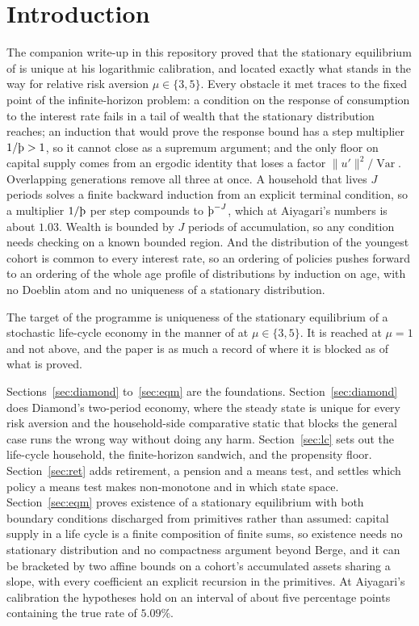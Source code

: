 \section{Introduction}

The companion write-up in this repository proved that the stationary equilibrium of
\citet{Aiyagari1994} is unique at his logarithmic calibration, and located exactly what stands in
the way for relative risk aversion $\mu\in\{3,5\}$. Every obstacle it met traces to the fixed point
of the infinite-horizon problem: a condition on the response of consumption to the interest rate
fails in a tail of wealth that the stationary distribution reaches; an induction that would prove
the response bound has a step multiplier $1/\Thorn>1$, so it cannot close as a supremum argument;
and the only floor on capital supply comes from an ergodic identity that loses a factor
$\|u'\|^2/\operatorname{Var}$. Overlapping generations remove all three at once. A household
that lives $J$ periods solves a finite backward induction from an explicit terminal condition, so
a multiplier $1/\Thorn$ per step compounds to $\Thorn^{-J}$, which at Aiyagari's numbers is about
$1.03$. Wealth is bounded by $J$ periods of accumulation, so any condition needs checking on a
known bounded region. And the distribution of the youngest cohort is common to every interest
rate, so an ordering of policies pushes forward to an ordering of the whole age profile of
distributions by induction on age, with no Doeblin atom and no uniqueness of a stationary
distribution.

The target of the programme is uniqueness of the stationary equilibrium of a stochastic life-cycle
economy in the manner of \citet{Huggett1996} at $\mu\in\{3,5\}$. It is reached at $\mu=1$ and not
above, and the paper is as much a record of where it is blocked as of what is proved.

Sections~\ref{sec:diamond} to~\ref{sec:eqm} are the foundations. Section~\ref{sec:diamond} does
Diamond's two-period economy, where the steady state is unique for every risk aversion and the
household-side comparative static that blocks the general case runs the wrong way without doing any
harm. Section~\ref{sec:lc} sets out the life-cycle household, the finite-horizon sandwich, and the
propensity floor. Section~\ref{sec:ret} adds retirement, a pension and a means test, and settles
which policy a means test makes non-monotone and in which state space. Section~\ref{sec:eqm} proves
existence of a stationary equilibrium with both boundary conditions discharged from primitives rather
than assumed: capital supply in a life cycle is a finite composition of finite sums, so existence
needs no stationary distribution and no compactness argument beyond Berge, and it can be bracketed by
two affine bounds on a cohort's accumulated assets sharing a slope, with every coefficient an explicit
recursion in the primitives. At Aiyagari's calibration the hypotheses hold on an interval of about
five percentage points containing the true rate of $5.09\%$.

